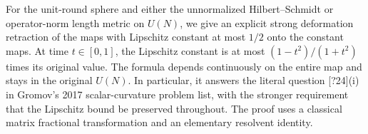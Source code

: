 
For the unit-round sphere and either the unnormalized Hilbert--Schmidt or operator-norm length metric on $U(N)$, we give an explicit strong deformation retraction of the maps with Lipschitz constant at most $1/2$ onto the constant maps. At time $t\in[0,1]$, the Lipschitz constant is at most $(1-t^2)/(1+t^2)$ times its original value. The formula depends continuously on the entire map and stays in the original $U(N)$. In particular, it answers the literal question [?24](i) in Gromov's 2017 scalar-curvature problem list, with the stronger requirement that the Lipschitz bound be preserved throughout. The proof uses a classical matrix fractional transformation and an elementary resolvent identity.
